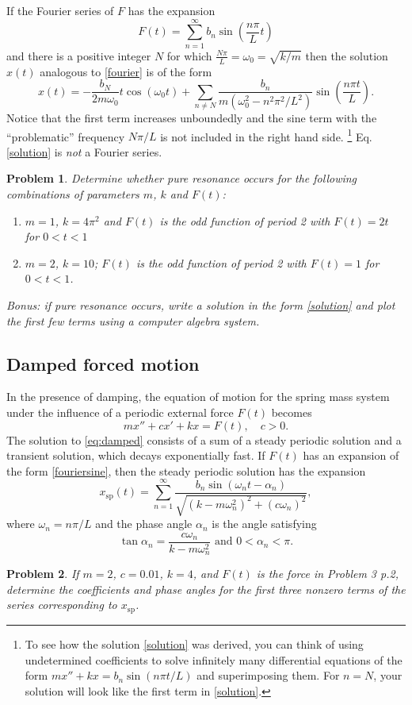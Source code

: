 \documentclass[11pt]{article}
\newcommand{\xsp}{x_{\mathrm{sp}}}
\renewcommand{\a}{\alpha}
\newcommand{\w}{\omega}
\newtheorem{problem}{Problem}
\begin{document}
If the Fourier series of $F$ has the expansion
\begin{equation}\label{fouriersine}
    F(t)= \sum_{n=1}^\infty b_n \sin\left(\frac{n\pi}{L}t\right)
\end{equation}and there is a positive integer $N$ for which $ \frac{N\pi}{L}=\w_0=\sqrt{k/m}$ then the solution  $x(t)$ analogous to \eqref{fourier} is of the form
\begin{equation}
    x(t)=-\frac{b_N}{2m\w_0}t\cos(\w_0 t)+\sum_{n\neq N}\dfrac{b_n}{m(\w_0^2-n^2\pi^2/L^2)}\sin\left(\frac{n\pi t}{L}\right).\label{solution}
\end{equation}
Notice that the first term increases unboundedly and the sine term with the ``problematic'' frequency $N\pi/L$ is not included in the right hand side.
\footnote{To see how the solution \eqref{solution} was derived, you can think of using undetermined coefficients to solve infinitely many differential equations of the form $mx''+kx=b_n\sin(n\pi t/L)$ and superimposing them. For $n=N$, your solution will look like the first term in \eqref{solution}.}
Eq. \eqref{solution} is \textit{not} a Fourier series.

\begin{problem}
    Determine whether pure resonance occurs for the following combinations of parameters $m$, $k$ and $F(t)$:
    \begin{enumerate}
        \item $m=1$, $k=4\pi^2$ and $F(t)$ is the odd function of period 2 with $F(t)=2t$ for $0<t<1$
        \item $m=2$, $k=10$; $F(t)$ is the odd function of period 2 with $F(t)=1$ for $0<t<1$.
    \end{enumerate}
    Bonus: if pure resonance occurs, write a solution in the form \eqref{solution} and plot the first few terms using a computer algebra system.
\end{problem}

\subsection*{Damped forced motion}
In the presence of damping, the equation of motion for the spring mass system under the influence of a periodic external force $F(t)$ becomes
\begin{equation}
    mx''+cx'+kx=F(t),\quad c>0.\label{eq:damped}
\end{equation}
The solution to \eqref{eq:damped} consists of a sum of a steady periodic solution and a transient solution, which decays exponentially fast. If $F(t)$ has an expansion of the form \eqref{fouriersine},
then the steady periodic solution has the expansion
\begin{equation}
    \xsp(t)=\sum_{n=1}^\infty\frac{b_n\sin(\w_nt-\a_n)}{\sqrt{(k-m\w_n^2)^2+(c\w_n)^2}},
\end{equation}
where $\w_n=n\pi/L$ and the phase angle $\a_n$ is the angle satisfying
\begin{equation}
    \tan \a_n=\frac{c\w_n}{k-m\w_n^2} \text{ and }0<\alpha_n<\pi.
\end{equation}

\begin{problem}
    If $m=2$, $c=0.01$, $k=4$, and $F(t)$  is the force in Problem 3 p.2, determine the coefficients and phase angles for the first three nonzero terms of the series corresponding to $\xsp$.
\end{problem}
\end{document}
